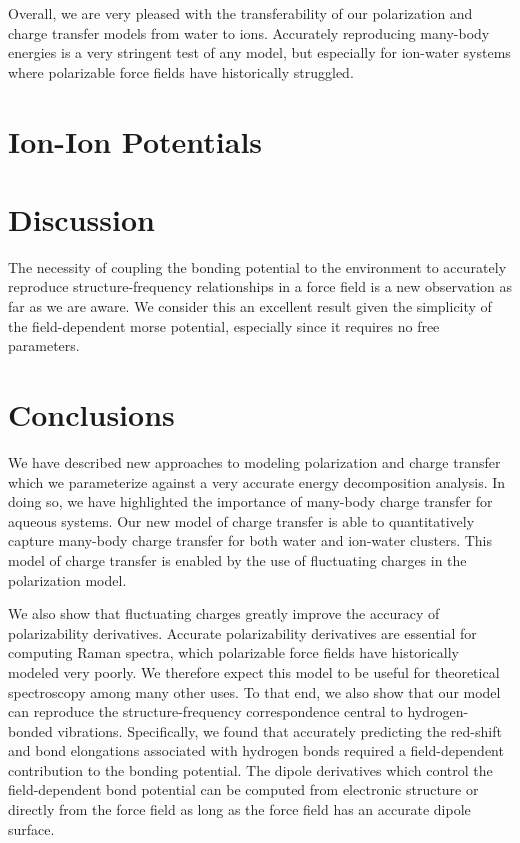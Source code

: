 \documentclass[journal=jctcce,manuscript=article]{achemso}
\begin{document}
Overall, we are very pleased with the transferability of our polarization and charge transfer models from water to ions. Accurately reproducing many-body energies is a very stringent test of any model, but especially for ion-water systems where polarizable force fields have historically struggled.

\section*{Ion-Ion Potentials}


\section*{Discussion}
The necessity
of coupling the bonding potential to the environment to accurately reproduce structure-frequency
relationships in a force field is a new observation as far as we are aware. We consider this an
excellent result given the simplicity of the field-dependent morse potential, especially since it
requires no free parameters. 
\section*{Conclusions}

We have described new approaches to modeling polarization and charge transfer which we parameterize against a very accurate energy decomposition analysis. In doing so, we have highlighted the importance of many-body charge transfer for aqueous systems. Our new model of charge transfer is able to quantitatively capture many-body charge transfer for both water and ion-water clusters. This model of charge transfer is enabled by the use of fluctuating charges in the polarization model.

We also show that fluctuating charges greatly improve the accuracy of polarizability derivatives. Accurate polarizability derivatives are essential for computing Raman spectra, which polarizable force fields have historically modeled very poorly. We therefore expect this model to be useful for theoretical spectroscopy among many other uses. To that end, we also show that our model can reproduce the structure-frequency correspondence central to hydrogen-bonded vibrations. Specifically, we found that accurately predicting the red-shift and bond elongations associated with hydrogen bonds required a field-dependent contribution to the bonding potential. The dipole derivatives which control the field-dependent bond potential can be computed from electronic structure or directly from the force field as long as the force field has an accurate dipole surface.
\end{document}
